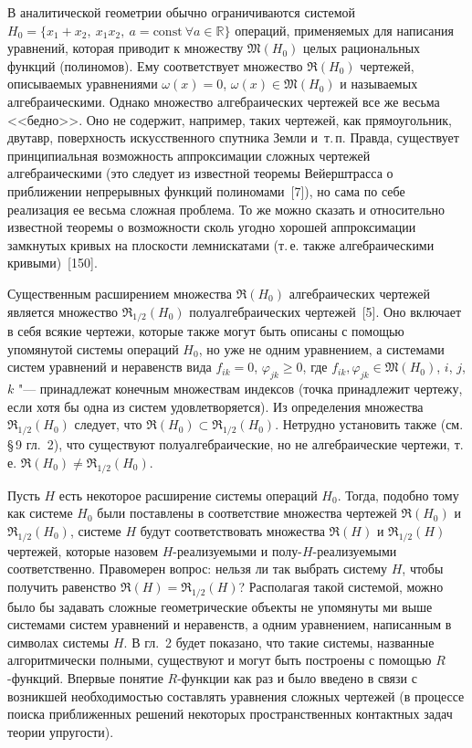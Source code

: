 В аналитической геометрии обычно ограничиваются системой
$H_0=\{x_1+x_2,\ x_1x_2,\ a=\mathrm{const}\ \forall a\in\mathbb R\}$
операций, применяемых для написания уравнений, которая приводит к множеству
$\mathfrak M(H_0)$ целых рациональных функций (полиномов). Ему соответствует
множество $\mathfrak R(H_0)$ чертежей, описываемых уравнениями $\omega(x)=0$,
$\omega(x)\in\mathfrak M(H_0)$ и называемых алгебраическими. Однако множество
алгебраических чертежей все же весьма <<бедно>>. Оно не содержит, например,
таких чертежей, как прямоугольник, двутавр, поверхность искусственного
спутника Земли и~т.\,п. Правда, существует принципиальная возможность
аппроксимации сложных чертежей алгебраическими (это следует из известной
теоремы Вейерштрасса о приближении непрерывных функций полиномами~[7]), но
сама по себе реализация ее весьма сложная проблема. То же можно сказать
и относительно известной теоремы о возможности сколь угодно хорошей
аппроксимации замкнутых кривых на плоскости лемнискатами (т.\,е. также
алгебраическими кривыми)~[150].

Существенным расширением множества $\mathfrak R(H_0)$ алгебраических
чертежей является множество $\mathfrak R_{1/2}(H_0)$ полуалгебраических
чертежей~[5]. Оно включает в себя всякие чертежи, которые также могут быть
описаны с помощью упомянутой системы операций $H_0$, но уже не одним
уравнением, а системами систем уравнений и неравенств вида $f_{ik}=0$,
$\varphi_{jk}\ge0$, где $f_{ik},\varphi_{jk}\in\mathfrak M(H_0)$, $i$, $j$,
$k$ "--- принадлежат конечным множествам индексов (точка принадлежит
чертежу, если хотя бы одна из систем удовлетворяется). Из определения
множества $\mathfrak R_{1/2}(H_0)$ следует, что
$\mathfrak R(H_0)\subset\mathfrak R_{1/2}(H_0)$. Нетрудно установить также
(см. \S\,9 гл.~2), что существуют полуалгебраические, но не алгебраические
чертежи, т.\,е. $\mathfrak R(H_0)\ne\mathfrak R_{1/2}(H_0)$.

Пусть $H$ есть некоторое расширение системы операций $H_0$. Тогда, подобно
тому как системе $H_0$ были поставлены в соответствие множества чертежей
$\mathfrak R(H_0)$ и $\mathfrak R_{1/2}(H_0)$, системе $H$ будут
соответствовать множества $\mathfrak R(H)$ и $\mathfrak R_{1/2}(H)$
чертежей, которые назовем $H$-реализуемыми и полу-$H$-реализуемыми
соответственно. Правомерен вопрос: нельзя ли так выбрать систему $H$, чтобы
получить равенство $\mathfrak R(H)=\mathfrak R_{1/2}(H)$? Располагая такой
системой, можно было бы задавать сложные геометрические объекты не
упомянуты\-%
%
ми выше системами систем уравнений и неравенств, а одним уравнением,
написанным в символах системы $H$. В гл.~2 будет показано, что такие
системы, названные алгоритмически полными, существуют и могут быть
построены с помощью $R$-функций. Впервые понятие $R$-функции как раз и было
введено в связи с возникшей необходимостью составлять уравнения сложных
чертежей (в процессе поиска приближенных решений некоторых пространственных
контактных задач теории упругости).

